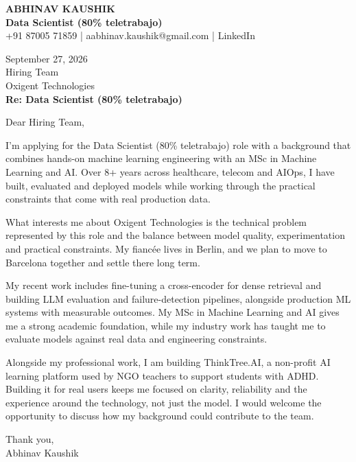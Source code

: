 \documentclass[10pt,a4paper]{article}
\begin{document}
\begin{center}
{\Large\bfseries ABHINAV KAUSHIK}\\[2pt]
{\bfseries Data Scientist (80\% teletrabajo)}\\[2pt]
+91 87005 71859 \quad | \quad aabhinav.kaushik@gmail.com \quad | \quad LinkedIn
\end{center}
\vspace{8pt}
September 27, 2026\\[6pt]
Hiring Team\\
Oxigent Technologies\\[4pt]
\textbf{Re: Data Scientist (80\% teletrabajo)}

Dear Hiring Team,

I’m applying for the Data Scientist (80\% teletrabajo) role with a background that combines hands-on machine learning engineering with an MSc in Machine Learning and AI. Over 8+ years across healthcare, telecom and AIOps, I have built, evaluated and deployed models while working through the practical constraints that come with real production data.

What interests me about Oxigent Technologies is the technical problem represented by this role and the balance between model quality, experimentation and practical constraints. My fiancée lives in Berlin, and we plan to move to Barcelona together and settle there long term.

My recent work includes fine-tuning a cross-encoder for dense retrieval and building LLM evaluation and failure-detection pipelines, alongside production ML systems with measurable outcomes. My MSc in Machine Learning and AI gives me a strong academic foundation, while my industry work has taught me to evaluate models against real data and engineering constraints.

Alongside my professional work, I am building ThinkTree.AI, a non-profit AI learning platform used by NGO teachers to support students with ADHD. Building it for real users keeps me focused on clarity, reliability and the experience around the technology, not just the model. I would welcome the opportunity to discuss how my background could contribute to the team.

Thank you,\\
Abhinav Kaushik
\end{document}
